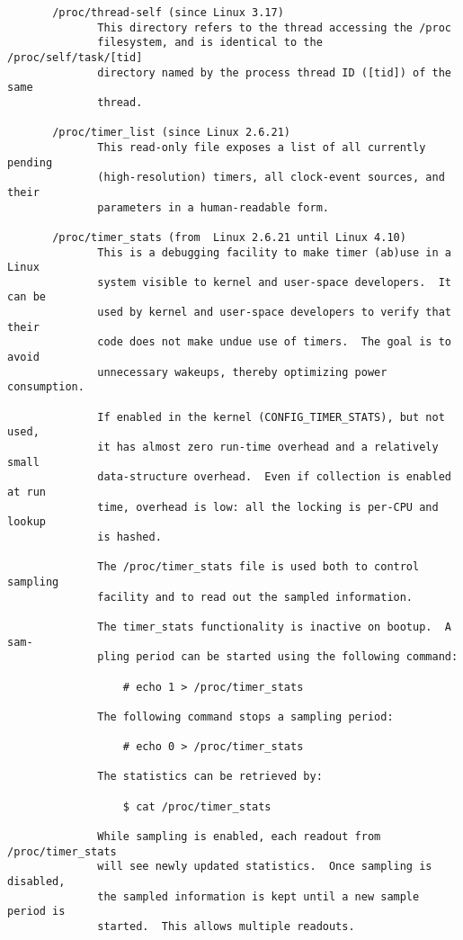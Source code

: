 \documentclass[]{article}
\begin{document}
\begin{verbatim}
       /proc/thread-self (since Linux 3.17)
              This directory refers to the thread accessing the /proc
              filesystem, and is identical to the /proc/self/task/[tid]
              directory named by the process thread ID ([tid]) of the same
              thread.

       /proc/timer_list (since Linux 2.6.21)
              This read-only file exposes a list of all currently pending
              (high-resolution) timers, all clock-event sources, and their
              parameters in a human-readable form.

       /proc/timer_stats (from  Linux 2.6.21 until Linux 4.10)
              This is a debugging facility to make timer (ab)use in a Linux
              system visible to kernel and user-space developers.  It can be
              used by kernel and user-space developers to verify that their
              code does not make undue use of timers.  The goal is to avoid
              unnecessary wakeups, thereby optimizing power consumption.

              If enabled in the kernel (CONFIG_TIMER_STATS), but not used,
              it has almost zero run-time overhead and a relatively small
              data-structure overhead.  Even if collection is enabled at run
              time, overhead is low: all the locking is per-CPU and lookup
              is hashed.

              The /proc/timer_stats file is used both to control sampling
              facility and to read out the sampled information.

              The timer_stats functionality is inactive on bootup.  A sam‐
              pling period can be started using the following command:

                  # echo 1 > /proc/timer_stats

              The following command stops a sampling period:

                  # echo 0 > /proc/timer_stats

              The statistics can be retrieved by:

                  $ cat /proc/timer_stats

              While sampling is enabled, each readout from /proc/timer_stats
              will see newly updated statistics.  Once sampling is disabled,
              the sampled information is kept until a new sample period is
              started.  This allows multiple readouts.


\end{verbatim}
\end{document}
